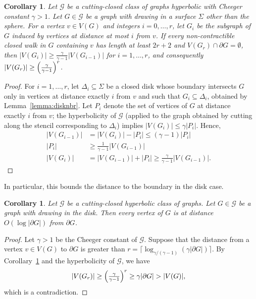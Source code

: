 \documentclass[12pt,twoside,openright,a4paper]{book}
\newtheorem{corollary}[theorem]{Corollary}
\newcommand{\GG}{\mathcal{G}}
\begin{document}
\begin{corollary}\label{cor:expgrowth}
Let $\GG$ be a cutting-closed class of graphs hyperbolic with Cheeger constant $\gamma>1$.
Let $G\in\GG$ be a graph with drawing in a surface $\Sigma$ other than the sphere.
For a vertex $v\in V(G)$ and integers $i=0,\ldots,r$, let $G_i$ be the subgraph of $G$ induced by vertices
at distance at most $i$ from $v$.
If every non-contractible closed walk in $G$ containing $v$ has length at least
$2r+2$ and $V(G_r)\cap \partial G=\emptyset$, then $|V(G_i)|\ge \tfrac{\gamma}{\gamma-1}|V(G_{i-1})|$ for $i=1,\ldots,r$, and
consequently $|V(G_r)|\ge \Bigl(\tfrac{\gamma}{\gamma-1}\Bigr)^r$.
\end{corollary}
\begin{proof}
For $i=1,\ldots,r$, let $\Delta_i\subseteq\Sigma$ be a closed disk whose boundary intersects $G$ only in vertices at
distance exactly $i$ from $v$ and such that $G_i\subseteq \Delta_i$, obtained by Lemma~\ref{lemma:disknbr}.
Let $P_i$ denote the set of vertices of $G$ at distance exactly $i$ from $v$; the hyperbolicity of $\GG$ (applied
to the graph obtained by cutting along the stencil corresponding to $\Delta_i$) implies $|V(G_i)|\le \gamma |P_i|$.
Hence,
\begin{align*}
|V(G_{i-1})|&=|V(G_i)|-|P_i|\le (\gamma-1)|P_i|\\
|P_i|&\ge \tfrac{1}{\gamma-1}|V(G_{i-1})|\\
|V(G_i)|&=|V(G_{i-1})|+|P_i|\ge \tfrac{\gamma}{\gamma-1}|V(G_{i-1})|.
\end{align*}
\end{proof}

In particular, this bounds the distance to the boundary in the disk case.

\begin{corollary}\label{cor:logdisk}
Let $\GG$ be a cutting-closed hyperbolic class of graphs.
Let $G\in\GG$ be a graph with drawing in the disk.  Then every vertex of $G$ is
at distance $O(\log |\partial G|)$ from $\partial G$.
\end{corollary}
\begin{proof}
Let $\gamma>1$ be the Cheeger constant of $\GG$.  Suppose that the distance from a vertex $v\in V(G)$ to $\partial G$
is greater than $r=\Big\lceil\log_{\gamma/(\gamma-1)}(\gamma|\partial G|)\Big\rceil$.  By Corollary~\ref{cor:expgrowth} and the hyperbolicity of $\GG$, we have
$$|V(G_r)|\ge \Bigl(\tfrac{\gamma}{\gamma-1}\Bigr)^r\ge \gamma|\partial G|>|V(G)|,$$
which is a contradiction.
\end{proof}
\end{document}
